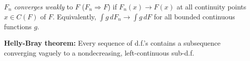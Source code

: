 $F_n$ \textit{converges weakly} to $F$ ($F_n \Rightarrow F$) if $F_n(x) \to F(x)$ at all continuity points $x \in C(F)$ of $F$. Equivalently, $\int g \, dF_n \to \int g \, dF$ for all bounded continuous functions $g$.

\textbf{Helly-Bray theorem:} Every sequence of d.f.'s contains a subsequence converging vaguely to a nondecreasing, left-continuous sub-d.f.
